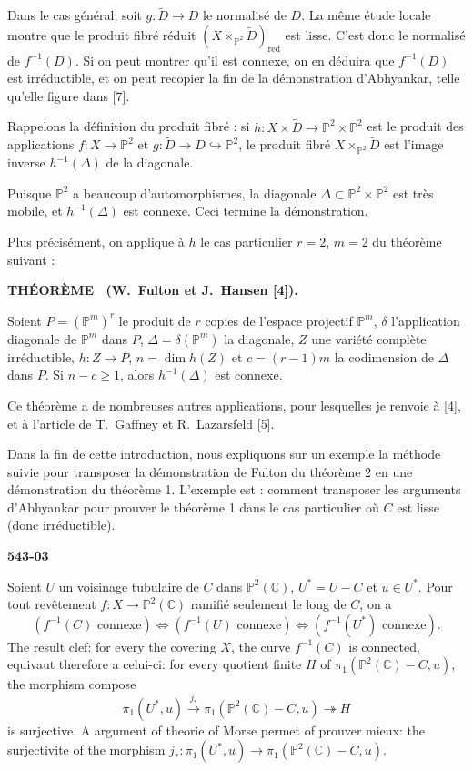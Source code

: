 \documentclass[12pt,a4paper]{article}
\newcounter{mainthm}
\newenvironment{maintheorem}[1][]{%
  \refstepcounter{mainthm}%
  \par\medskip\noindent\textbf{THÉORÈME \themainthm#1.}~\ignorespaces
}{\par\medskip}
\begin{document}
Dans le cas général, soit $g : \widetilde{D} \to D$ le normalisé de $D$. La même étude locale montre que le produit fibré réduit $(X \times_{\mathbb{P}^2} \widetilde{D})_{\mathrm{red}}$ est lisse. C'est donc le normalisé de $f^{-1}(D)$. Si on peut montrer qu'il est connexe, on en déduira que $f^{-1}(D)$ est irréductible, et on peut recopier la fin de la démonstration d'Abhyankar, telle qu'elle figure dans [7].

Rappelons la définition du produit fibré : si $h : X \times \widetilde{D} \to \mathbb{P}^2 \times \mathbb{P}^2$ est le produit des applications $f : X \to \mathbb{P}^2$ et $g : \widetilde{D} \to D \hookrightarrow \mathbb{P}^2$, le produit fibré $X \times_{\mathbb{P}^2} \widetilde{D}$ est l'image inverse $h^{-1}(\Delta)$ de la diagonale.

Puisque $\mathbb{P}^2$ a beaucoup d'automorphismes, la diagonale $\Delta \subset \mathbb{P}^2 \times \mathbb{P}^2$ est très mobile, et $h^{-1}(\Delta)$ est connexe. Ceci termine la démonstration.

Plus précisément, on applique à $h$ le cas particulier $r = 2$, $m = 2$ du théorème suivant :

\begin{maintheorem}[~(W.\ Fulton et J.\ Hansen {[4]})]
Soient $P = (\mathbb{P}^m)^r$ le produit de $r$ copies de l'espace projectif $\mathbb{P}^m$, $\delta$ l'application diagonale de $\mathbb{P}^m$ dans $P$, $\Delta = \delta(\mathbb{P}^m)$ la diagonale, $Z$ une variété complète irréductible, $h : Z \to P$, $n = \dim h(Z)$ et $c = (r-1)m$ la codimension de $\Delta$ dans $P$. Si $n - c \geq 1$, alors $h^{-1}(\Delta)$ est connexe.
\end{maintheorem}

Ce théorème a de nombreuses autres applications, pour lesquelles je renvoie à [4], et à l'article de T.\ Gaffney et R.\ Lazarsfeld [5].

Dans la fin de cette introduction, nous expliquons sur un exemple la méthode suivie pour transposer la démonstration de Fulton du théorème 2 en une démonstration du théorème 1. L'exemple est : comment transposer les arguments d'Abhyankar pour prouver le théorème 1 dans le cas particulier où $C$ est lisse (donc irréductible).

\newpage
\begin{flushright}
\textbf{543-03}
\end{flushright}

Soient $U$ un voisinage tubulaire de $C$ dans $\mathbb{P}^2(\mathbb{C})$, $U^* = U - C$ et $u \in U^*$. Pour tout revêtement $f : X \to \mathbb{P}^2(\mathbb{C})$ ramifié seulement le long de $C$, on a
\[
(f^{-1}(C) \text{ connexe}) \Longleftrightarrow (f^{-1}(U) \text{ connexe}) \Longleftrightarrow (f^{-1}(U^*) \text{ connexe}).
\]
The result clef: for every the covering $X$, the curve $f^{-1}(C)$ is connected, equivaut therefore a celui-ci: for every quotient finite $H$ of $\pi_1(\mathbb{P}^2(\mathbb{C}) - C, u)$, the morphism compose
\[
\pi_1(U^*, u) \xrightarrow{j_*} \pi_1(\mathbb{P}^2(\mathbb{C}) - C, u) \twoheadrightarrow H
\]
is surjective. A argument of theorie of Morse permet of prouver mieux: the surjectivite of the morphism $j_* : \pi_1(U^*, u) \to \pi_1(\mathbb{P}^2(\mathbb{C}) - C, u)$.
\end{document}
